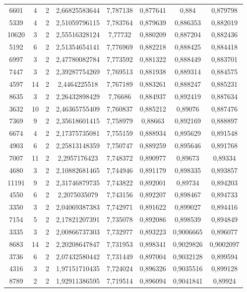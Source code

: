 \begin{longtable}{|c|c|c|c|c|c|c|c|}
6601 & 4 & 2 & 2,66825583644 & 7,787138 & 0,877641 & 0,884 & 0,879798 \\
5339 & 4 & 2 & 2,51059796115 & 7,783764 & 0,879639 & 0,886353 & 0,882019 \\
10620 & 3 & 2 & 2,55516328124 & 7,77732 & 0,880209 & 0,887204 & 0,882436 \\
5192 & 6 & 2 & 2,51354654141 & 7,776969 & 0,882218 & 0,888425 & 0,884418 \\
6997 & 3 & 2 & 2,47780082784 & 7,773592 & 0,881322 & 0,888449 & 0,883701 \\
7447 & 3 & 2 & 2,39287754269 & 7,769513 & 0,881938 & 0,889314 & 0,884575 \\
4597 & 14 & 2 & 2,4464225518 & 7,767189 & 0,883261 & 0,888247 & 0,885231 \\
8635 & 3 & 2 & 2,26432898429 & 7,76686 & 0,884937 & 0,892419 & 0,887634 \\
3632 & 10 & 2 & 2,46365755409 & 7,760837 & 0,885212 & 0,89076 & 0,887476 \\
7369 & 9 & 2 & 2,35618601415 & 7,758979 & 0,88663 & 0,892169 & 0,888897 \\
6674 & 4 & 2 & 2,17375735081 & 7,755159 & 0,888934 & 0,895629 & 0,891548 \\
4903 & 6 & 2 & 2,25813148359 & 7,750747 & 0,889259 & 0,895646 & 0,891768 \\
7007 & 11 & 2 & 2,2957176423 & 7,748372 & 0,890977 & 0,89673 & 0,89334 \\
4680 & 3 & 2 & 2,10882681465 & 7,744946 & 0,891179 & 0,898335 & 0,893857 \\
11191 & 9 & 2 & 2,31746879735 & 7,743822 & 0,892001 & 0,89734 & 0,894203 \\
4550 & 6 & 2 & 2,2075035079 & 7,743156 & 0,892207 & 0,898467 & 0,894733 \\
3350 & 3 & 2 & 2,04069387383 & 7,742971 & 0,891622 & 0,899027 & 0,894416 \\
7154 & 5 & 2 & 2,17821207391 & 7,735078 & 0,892086 & 0,898539 & 0,894849 \\
3335 & 3 & 2 & 2,00866737303 & 7,732977 & 0,893223 & 0,9006665 & 0,896077 \\
8683 & 14 & 2 & 2,20208647847 & 7,731953 & 0,898341 & 0,9029826 & 0,9002097 \\
3736 & 6 & 2 & 2,07432580442 & 7,731449 & 0,897004 & 0,9032128 & 0,899594 \\
4316 & 3 & 2 & 1,97151710435 & 7,724024 & 0,896326 & 0,9035516 & 0,899128 \\
8789 & 2 & 2 & 1,92911386595 & 7,719514 & 0,896094 & 0,9041841 & 0,89924 \\

\end{longtable}
